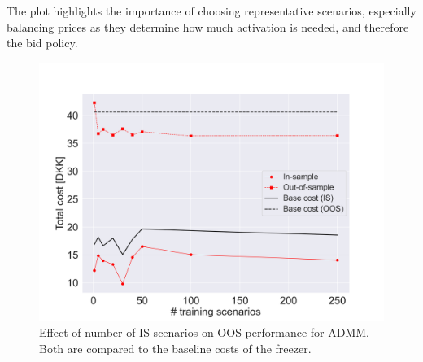 The plot highlights the importance of choosing representative scenarios, especially balancing prices as they determine how much activation is needed, and therefore the bid policy.

\begin{figure}[!t]
    \centering
    \includegraphics[width=\columnwidth]{../figures/admm_nb_scenarios_effect.png}
    \caption{Effect of number of IS scenarios on OOS performance for ADMM. Both are compared to the baseline costs of the freezer.}
    \label{fig:admm_nb_scenarios_effect}
\end{figure}


